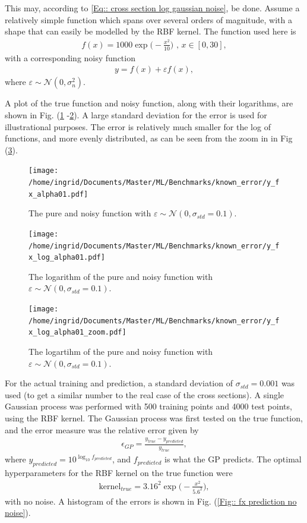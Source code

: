 \documentclass[twoside,english]{uiofysmaster}
\begin{document}
This may, according to \ref{Eq:: cross section log gaussian noise}, be done. Assume a relatively simple function which spans over several orders of magnitude, with a shape that can easily be modelled by the RBF kernel. The function used here is
\begin{align}
f(x) =  1000 \exp \Big(-\frac{x^2}{10}\Big) \text{ , } x \in [0, 30],
\end{align} 
with a corresponding noisy function 
\begin{align}
y = f(x) + \varepsilon f(x),
\end{align}
where $\varepsilon \sim \mathcal{N} (0, \sigma_n^2)$.

A plot of the true function and noisy function, along with their logarithms, are shown in Fig. (\ref{Fig:: y and fx} -\ref{Fig:: log y and log fx}). A large standard deviation for the error is used for illustrational purposes. The error is relatively much smaller for the log of functions, and more evenly distributed, as can be seen from the zoom in in Fig (\ref{Fig:: log y and log fx zoom}).

\begin{figure}
\centering
\texttt{[image: /home/ingrid/Documents/Master/ML/Benchmarks/known\_error/y\_fx\_alpha01.pdf]}
\caption{The pure and noisy function with $\varepsilon \sim \mathcal{N} (0, \sigma_{std} = 0.1)$.}
\label{Fig:: y and fx}
\end{figure} 

\begin{figure}
\centering
\texttt{[image: /home/ingrid/Documents/Master/ML/Benchmarks/known\_error/y\_fx\_log\_alpha01.pdf]}
\caption{The logarithm of the pure and noisy function with $\varepsilon \sim \mathcal{N} (0, \sigma_{std} = 0.1)$.}
\label{Fig:: log y and log fx}
\end{figure} 

\begin{figure}
\centering
\texttt{[image: /home/ingrid/Documents/Master/ML/Benchmarks/known\_error/y\_fx\_log\_alpha01\_zoom.pdf]}
\caption{The logartihm of the pure and noisy function with $\varepsilon \sim \mathcal{N} (0, \sigma_{std} = 0.1)$.}
\label{Fig:: log y and log fx zoom}
\end{figure} 

For the actual training and prediction, a standard deviation of $\sigma_{std} = 0.001$ was used (to get a similar number to the real case of the cross sections). A single Gaussian process was performed with 500 training points and 4000 test points, using the RBF kernel. The Gaussian process was first tested on the true function, and the error measure was the relative error given by
\begin{align}
\epsilon_{GP} = \frac{y_{true} - y_{predicted}}{y_{true}},
\end{align}
where $y_{predicted} = 10^{\log_{10} f_{predicted}}$, and $f_{predicted}$ is what the GP predicts. The optimal hyperparameters for the RBF kernel on the true function were
\begin{align*}
\text{kernel}_{true} = 3.16^2 \exp \Big( - \frac{x^2}{5.6^2} \Big),
\end{align*}
with no noise. A histogram of the errors is shown in Fig. (\ref{Fig:: fx prediction no noise}).
\end{document}
